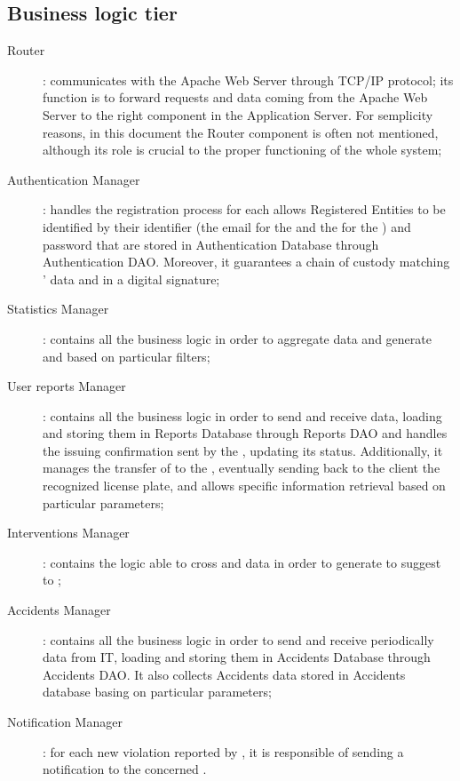 \documentclass[../../DD.tex]{subfiles}
\begin{document}
\subsection{Business logic tier\label{sect:2.2.3}}
	\begin{description}
	\item[Router]: communicates with the Apache Web Server through TCP/IP protocol; its function is to forward requests and data coming from the Apache Web Server to the right component in the Application Server. For semplicity reasons, in this document the Router component is often not mentioned, although its role is crucial to the proper functioning of the whole system;
	 
	\item[Authentication Manager]: handles the registration process for each 
	allows Registered Entities to be identified by their identifier (the email for the  and the  for the ) and password that are stored in Authentication Database through Authentication DAO. Moreover, it guarantees a chain of custody matching ' data and  in a digital signature;
	
	\item[Statistics Manager]: contains all the business logic in order to aggregate  data and generate  and   based on particular filters;
	
	\item[User reports Manager]: contains all the business logic in order to send and receive  data, loading and storing them in Reports Database through Reports DAO and handles the  issuing confirmation sent by the , updating its status. Additionally, it manages the transfer of  to the , eventually sending back to the client the recognized license plate, and allows specific  information retrieval based on particular parameters;
	
	\item[Interventions Manager]: contains the logic able to cross  and  data in order to generate  to suggest to ;
	
	\item[Accidents Manager]: contains all the business logic in order to send and receive periodically  data from  IT, loading and storing them in Accidents Database through Accidents DAO. It also collects Accidents data stored in Accidents database basing on particular parameters;
	
	\item[Notification Manager]: for each new violation reported by , it is responsible of sending a notification to the concerned .
	\end{description}
\end{document}
